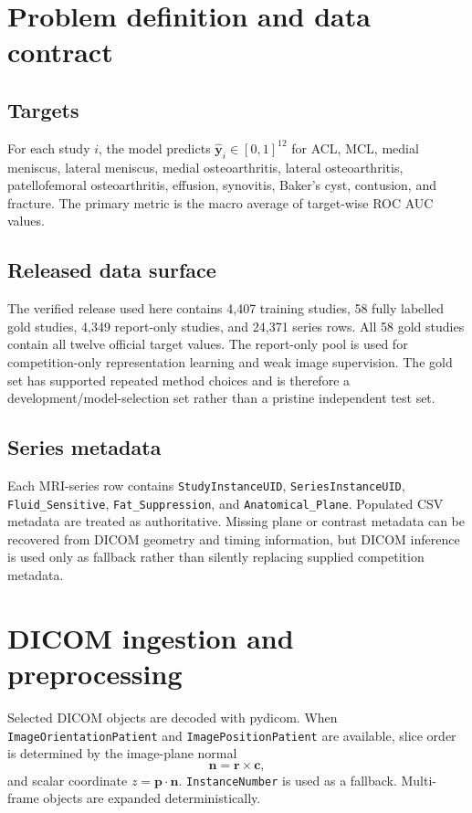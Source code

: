 \documentclass[preprint,12pt]{elsarticle}
\newcommand{\code}[1]{\texttt{#1}}
\begin{document}
\section{Problem definition and data contract}
\label{sec:problem}

\subsection{Targets}
For each study $i$, the model predicts $\hat{\mathbf y}_i\in[0,1]^{12}$ for ACL, MCL, medial meniscus, lateral meniscus, medial osteoarthritis, lateral osteoarthritis, patellofemoral osteoarthritis, effusion, synovitis, Baker's cyst, contusion, and fracture. The primary metric is the macro average of target-wise ROC AUC values.

\subsection{Released data surface}
The verified release used here contains 4,407 training studies, 58 fully labelled gold studies, 4,349 report-only studies, and 24,371 series rows. All 58 gold studies contain all twelve official target values. The report-only pool is used for competition-only representation learning and weak image supervision. The gold set has supported repeated method choices and is therefore a development/model-selection set rather than a pristine independent test set.

\subsection{Series metadata}
Each MRI-series row contains \code{StudyInstanceUID}, \code{SeriesInstanceUID}, \code{Fluid\_Sensitive}, \code{Fat\_Suppression}, and \code{Anatomical\_Plane}. Populated CSV metadata are treated as authoritative. Missing plane or contrast metadata can be recovered from DICOM geometry and timing information, but DICOM inference is used only as fallback rather than silently replacing supplied competition metadata.

\section{DICOM ingestion and preprocessing}
\label{sec:dicom}

Selected DICOM objects are decoded with pydicom. When \code{ImageOrientationPatient} and \code{ImagePositionPatient} are available, slice order is determined by the image-plane normal
\begin{equation}
\mathbf n=\mathbf r\times\mathbf c,
\end{equation}
and scalar coordinate $z=\mathbf p\cdot\mathbf n$. \code{InstanceNumber} is used as a fallback. Multi-frame objects are expanded deterministically.
\end{document}

